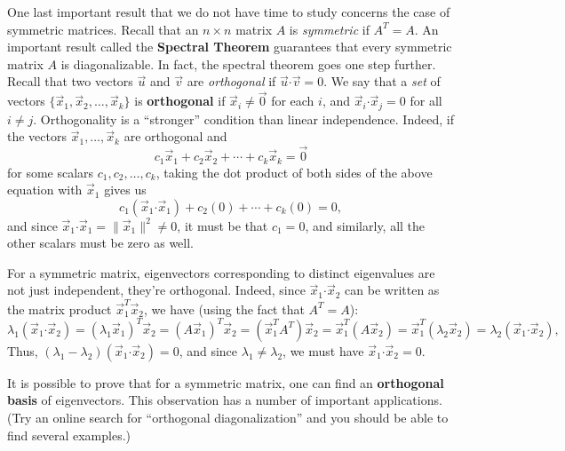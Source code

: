 \documentclass[12pt,letterpaper]{article}
\newcommand{\dotp}{\boldsymbol{\cdot}}
\begin{document}
\medskip

One last important result that we do not have time to study concerns the case of symmetric matrices. Recall that an $n\times n$ matrix $A$ is \textit{symmetric} if $A^T=A$. An important result called the \textbf{Spectral Theorem} guarantees that every symmetric matrix $A$ is diagonalizable. In fact, the spectral theorem goes one step further. Recall that two vectors $\vec{u}$ and $\vec{v}$ are \textit{orthogonal} if $\vec{u}\dotp\vec{v}=0$. We say that a \textit{set} of vectors $\{\vec{x}_1,\vec{x}_2,\ldots, \vec{x}_k\}$ is \textbf{orthogonal} if $\vec{x}_i\neq \vec{0}$ for each $i$, and $\vec{x}_i\dotp \vec{x}_j = 0$ for all $i\neq j$. Orthogonality is a ``stronger'' condition than linear independence. Indeed, if the vectors $\vec{x}_1,\ldots, \vec{x}_k$ are orthogonal and
\[
 c_1\vec{x}_1+c_2\vec{x}_2+\cdots + c_k\vec{x}_k = \vec{0}
\]
for some scalars $c_1,c_2,\ldots, c_k$, taking the dot product of both sides of the above equation with $\vec{x}_1$ gives us
\[
 c_1(\vec{x}_1\dotp \vec{x}_1)+c_2(0)+\cdots + c_k(0)=0,
\]
and since $\vec{x}_1\dotp \vec{x}_1 = \lVert \vec{x}_1\rVert^2 \neq 0$, it must be that $c_1=0$, and similarly, all the other scalars must be zero as well.

For a symmetric matrix, eigenvectors corresponding to distinct eigenvalues are not just independent, they're orthogonal. Indeed, since $\vec{x}_1\dotp \vec{x}_2$ can be written as the matrix product  $\vec{x}_1^T\vec{x}_2$, we have (using the fact that $A^T=A$):
\[
 \lambda_1(\vec{x}_1\dotp \vec{x}_2) = (\lambda_1\vec{x}_1)^T\vec{x}_2 = (A\vec{x}_1)^T\vec{x}_2 = (\vec{x}_1^TA^T)\vec{x}_2 = \vec{x}_1^T(A\vec{x}_2) = \vec{x}_1^T(\lambda_2\vec{x}_2) = \lambda_2(\vec{x}_1\dotp \vec{x}_2),
\]
Thus, $(\lambda_1-\lambda_2)(\vec{x}_1\dotp\vec{x}_2) = 0$, and since $\lambda_1\neq \lambda_2$, we must have $\vec{x}_1\dotp \vec{x}_2 = 0$.

It is possible to prove that for a symmetric matrix, one can find an \textbf{orthogonal basis} of eigenvectors. This observation has a number of important applications. (Try an online search for ``orthogonal diagonalization'' and you should be able to find several examples.)
\end{document}
